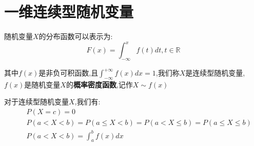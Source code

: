 \section{一维连续型随机变量}
\begin{definition}[连续型随机变量分布函数和密度函数]
	随机变量$X$的分布函数可以表示为: 
	$$F(x)=\int_{-\infty}^{x}f(t)dt,t\in\mathbb{R}$$
	
	其中$f(x)$是非负可积函数,且$\int_{-\infty}^{+\infty}f(x)dx=1$,我们称$X$是连续型随机变量,$f(x)$是随机变量$X$的\textbf{概率密度函数},记作$X\sim f(x)$
	
	对于连续型随机变量$X$,我们有: 
	\begin{eqnarray*}
		&&P(X=c)=0\\ 
		&&P(a<X<b)=P(a\leq X<b)=P(a<X\leq b)=P(a\leq X\leq b)\\
		&&P(a<X<b)=\int_{a}^{b}f(x)dx
	\end{eqnarray*}
\end{definition}
